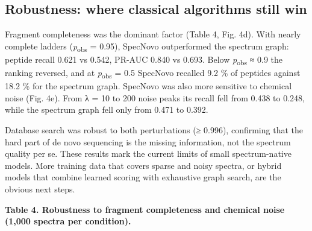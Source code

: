 \documentclass[
]{article}
\begin{document}
\hypertarget{robustness-where-classical-algorithms-still-win}{%
\subsection{Robustness: where classical algorithms still
win}\label{robustness-where-classical-algorithms-still-win}}

Fragment completeness was the dominant factor (Table 4, Fig. 4d). With
nearly complete ladders (\emph{p}\textsubscript{obs} = 0.95), SpecNovo
outperformed the spectrum graph: peptide recall 0.621 vs 0.542, PR-AUC
0.840 vs 0.693. Below \emph{p}\textsubscript{obs} ≈ 0.9 the ranking
reversed, and at \emph{p}\textsubscript{obs} = 0.5 SpecNovo recalled 9.2
\% of peptides against 18.2 \% for the spectrum graph. SpecNovo was also
more sensitive to chemical noise (Fig. 4e). From λ = 10 to 200 noise
peaks its recall fell from 0.438 to 0.248, while the spectrum graph fell
only from 0.471 to 0.392.

Database search was robust to both perturbations (≥ 0.996), confirming
that the hard part of de novo sequencing is the missing information, not
the spectrum quality per se. These results mark the current limits of
small spectrum-native models. More training data that covers sparse and
noisy spectra, or hybrid models that combine learned scoring with
exhaustive graph search, are the obvious next steps.

\textbf{Table 4. Robustness to fragment completeness and chemical noise
(1,000 spectra per condition).}
\end{document}
